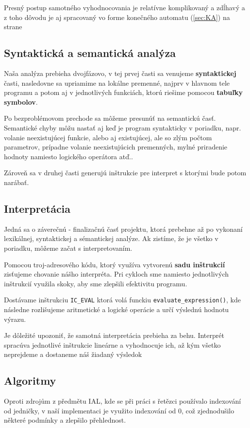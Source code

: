 \documentclass[12pt, a4paper]{article}
\begin{document}
        Presný postup samotného vyhodnocovania je relatívne komplikovaný a zdĺhavý a z toho dôvodu je aj spracovaný vo forme konečného automatu (\ref{sec:KA}) na strane \pageref{sec:KA}

        \subsection{Syntaktická a semantická analýza}
        Naša analýza prebieha dvojfázovo, v tej prvej časti sa venujeme \textbf{syntaktickej} časti, nasledovne sa upriamime na lokálne premenné, najprv v hlavnom tele programu a potom aj v jednotlivých funkciách, ktorú riešime pomocou \textbf{tabuľky symbolov}.

        Po bezproblémovom prechode sa môžeme presunúť na semantickú časť. Semantické chyby môžu nastať aj keď je program syntakticky v poriadku, napr. volanie neexistujúcej funkcie, alebo aj existujúcej, ale so zlým počtom parametrov, prípadne volanie neexistujúcich premenných, mylné priradenie hodnoty namiesto logického operátora atď..

        Zároveň sa v druhej časti generujú inštrukcie pre interpret s ktorými bude potom narábať.
        \newpage
        \subsection{Interpretácia}
        Jedná sa o záverečnú - finalizačnú časť projektu, ktorá prebehne až po vykonaní lexikálnej, syntaktickej a sémantickej analýze. Ak zistíme, že je všetko v poriadku, môžeme začat s interpretovaním.

        Pomocou troj-adresového kódu, ktorý využíva  vytvorenú \textbf{sadu inštrukcií} zisťujeme chovanie nášho interpréta. Pri cykloch sme namiesto jednotlivých inštrukcií využila skoky, aby sme zlepšili efektivitu programu.

        Dostávame inštrukciu \verb|IC_EVAL| ktorá volá funckiu \verb|evaluate_expression()|, kde následne rozlišujeme aritmetické a logické operácie a určí výslednú hodnotu výrazu.

        Je dôležité upozoniť, že samotná interpretácia prebieha za behu. Interprét spracúva jednotlivé inštrukcie lineárne a vyhodnocuje ich, až kým všetko neprejdeme a dostaneme náš žiadaný výsledok

        \subsection{Algoritmy}
        Oproti zdrojům z předmětu IAL, kde se při práci s řetězci používalo indexování od jedničky, v naší implementaci je využito indexování od 0, což zjednodušilo některé podmínky a zlepšilo přehlednost.
\end{document}
